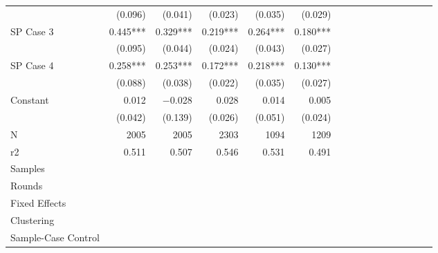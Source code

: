 \begin{tabular}{@{\extracolsep{5pt}}lrrrrrrrrrrrrrrr}
& (0.096)\phantom{***} & (0.041)\phantom{***} & (0.023)\phantom{***} & (0.035)\phantom{***} & (0.029)\phantom{***} \\
SP Case 3 & 0.445\phantom{)}*** & 0.329\phantom{)}*** & 0.219\phantom{)}*** & 0.264\phantom{)}*** & 0.180\phantom{)}*** \\
& (0.095)\phantom{***} & (0.044)\phantom{***} & (0.024)\phantom{***} & (0.043)\phantom{***} & (0.027)\phantom{***} \\
SP Case 4 & 0.258\phantom{)}*** & 0.253\phantom{)}*** & 0.172\phantom{)}*** & 0.218\phantom{)}*** & 0.130\phantom{)}*** \\
& (0.088)\phantom{***} & (0.038)\phantom{***} & (0.022)\phantom{***} & (0.035)\phantom{***} & (0.027)\phantom{***} \\
Constant & 0.012\phantom{\phantom{)}***} & $-$0.028\phantom{\phantom{)}***} & 0.028\phantom{\phantom{)}***} & 0.014\phantom{\phantom{)}***} & 0.005\phantom{\phantom{)}***} \\
& (0.042)\phantom{***} & (0.139)\phantom{***} & (0.026)\phantom{***} & (0.051)\phantom{***} & (0.024)\phantom{***} \\
\hline
N & 2005\phantom{***} & 2005\phantom{***} & 2303\phantom{***} & 1094\phantom{***} & 1209\phantom{***} \\
r2 & 0.511\phantom{***} & 0.507\phantom{***} & 0.546\phantom{***} & 0.531\phantom{***} & 0.491\phantom{***} \\
{Samples}} & \multicolumn{1}{p{0.13\linewidth}}{\centering{1a 2a 3}} & \multicolumn{1}{p{0.13\linewidth}}{\centering{1a 2a 3}} & \multicolumn{1}{p{0.13\linewidth}}{\centering{All}} & \multicolumn{1}{p{0.13\linewidth}}{\centering{All}} & \multicolumn{1}{p{0.13\linewidth}}{\centering{All}} \\
{Rounds}} & \multicolumn{1}{p{0.13\linewidth}}{\centering{All}} & \multicolumn{1}{p{0.13\linewidth}}{\centering{All}} & \multicolumn{1}{p{0.13\linewidth}}{\centering{All}} & \multicolumn{1}{p{0.13\linewidth}}{\centering{All}} & \multicolumn{1}{p{0.13\linewidth}}{\centering{All}} \\
{Fixed Effects}} & \multicolumn{1}{p{0.13\linewidth}}{\centering{Provider}} & \multicolumn{1}{p{0.13\linewidth}}{\centering{Provider}} & \multicolumn{1}{p{0.13\linewidth}}{\centering{Provider-Facility}} & \multicolumn{1}{p{0.13\linewidth}}{\centering{Provider-Facility}} & \multicolumn{1}{p{0.13\linewidth}}{\centering{Provider-Facility}} \\
{Clustering}} & \multicolumn{1}{p{0.13\linewidth}}{\centering{Facility}} & \multicolumn{1}{p{0.13\linewidth}}{\centering{Facility}} & \multicolumn{1}{p{0.13\linewidth}}{\centering{Robust}} & \multicolumn{1}{p{0.13\linewidth}}{\centering{Robust}} & \multicolumn{1}{p{0.13\linewidth}}{\centering{Robust}} \\
{Sample-Case Control}} & \multicolumn{1}{p{0.13\linewidth}}{\centering{Yes}} & \multicolumn{1}{p{0.13\linewidth}}{\centering{Yes}} & \multicolumn{1}{p{0.13\linewidth}}{\centering{No}} & \multicolumn{1}{p{0.13\linewidth}}{\centering{No}} & \multicolumn{1}{p{0.13\linewidth}}{\centering{No}} \\
\hline
\end{tabular}

